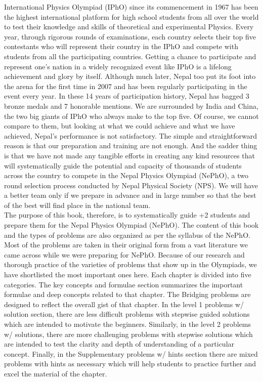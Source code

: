 \hspace{1cm} International Physics Olympiad (IPhO) since its commencement in 1967 has been the highest international platform for high school students from all over the world to test their knowledge and skills of theoretical and experimental Physics. Every year, through rigorous rounds of examinations, each country selects their top five contestants who will represent their country in the IPhO and compete with students from all the participating countries. Getting a chance to participate and represent one’s nation in a widely recognized event like IPhO is a lifelong achievement and glory by itself. Although much later, Nepal too put its foot into the arena for the first time in 2007 and has been regularly participating in the event every year. In these 14 years of participation history, Nepal has bagged 3 bronze medals and 7 honorable mentions. We are surrounded by India and China, the two big giants of IPhO who always make to the top five. Of course, we cannot compare to them, but looking at what we could achieve and what we have achieved, Nepal’s performance is not satisfactory. The simple and straightforward reason is that our preparation and training are not enough. And the sadder thing is that we have not made any tangible efforts in creating any kind resources that will systematically guide the potential and capacity of thousands of students across the country to compete in the Nepal Physics Olympiad (NePhO), a two round selection process conducted by Nepal Physical Society (NPS). We will have a better team only if we prepare in advance and in large number so that the best of the best will find place in the national team.     \\
 
\hspace{1cm} The purpose of this book, therefore, is to systematically guide +2 students and prepare them for the Nepal Physics Olympiad (NePhO). The content of this book and the types of problems are also organized as per the syllabus of the NePhO. Most of the problems are taken in their original form from a vast literature we came across while we were preparing for NePhO. Because of our research and thorough practice of the varieties of problems that show up in the Olympiads, we have shortlisted the most important ones here. Each chapter is divided into five categories. The key concepts and formulae section summarizes the important formulae and deep concepts related to that chapter. The Bridging problems are designed to reflect the overall gist of that chapter. In the level 1 problems w/ solution section, there are less difficult problems with stepwise guided solutions which are intended to motivate the beginners. Similarly, in the level 2 problems w/ solutions, there are more challenging problems with stepwise solutions which are intended to test the clarity and depth of understanding of a particular concept. Finally, in the Supplementary problems w/ hints section there are mixed problems with hints as necessary which will help students to practice further and excel the material of the chapter.\\

